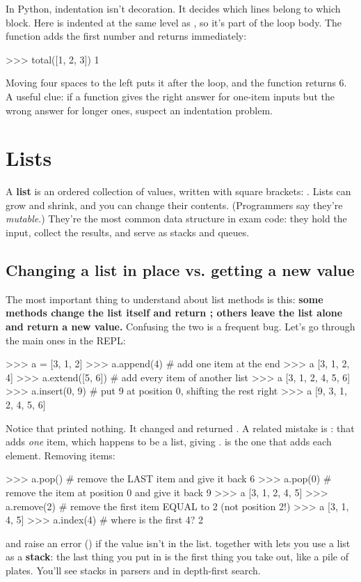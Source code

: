 \documentclass[10pt,a4paper]{article}
\begin{document}
In Python, indentation isn’t decoration. It decides which lines belong to which block. Here  is indented at the same level as , so it’s part of the loop body. The function adds the first number and returns immediately:
\begin{txtcode}
>>> total([1, 2, 3])
1
\end{txtcode}
Moving  four spaces to the left puts it after the loop, and the function returns 6. A useful clue: if a function gives the right answer for one-item inputs but the wrong answer for longer ones, suspect an indentation problem.
\setcounter{section}{5}
\section{Lists}
A \textbf{list} is an ordered collection of values, written with square brackets: . Lists can grow and shrink, and you can change their contents. (Programmers say they’re \emph{mutable}.) They’re the most common data structure in exam code: they hold the input, collect the results, and serve as stacks and queues.
\subsection{Changing a list in place vs. getting a new value}
The most important thing to understand about list methods is this: \textbf{some methods change the list itself and return ; others leave the list alone and return a new value.} Confusing the two is a frequent bug.
Let’s go through the main ones in the REPL:
\begin{txtcode}
>>> a = [3, 1, 2]
>>> a.append(4)          # add one item at the end
>>> a
[3, 1, 2, 4]
>>> a.extend([5, 6])     # add every item of another list
>>> a
[3, 1, 2, 4, 5, 6]
>>> a.insert(0, 9)       # put 9 at position 0, shifting the rest right
>>> a
[9, 3, 1, 2, 4, 5, 6]
\end{txtcode}
Notice that  printed nothing. It changed  and returned . A related mistake is : that adds \emph{one} item, which happens to be a list, giving \code{[...,\allowbreak{}\ [5,\allowbreak{}\ 6]]}.  is the one that adds each element.
Removing items:
\begin{txtcode}
>>> a.pop()              # remove the LAST item and give it back
6
>>> a.pop(0)             # remove the item at position 0 and give it back
9
>>> a
[3, 1, 2, 4, 5]
>>> a.remove(2)          # remove the first item EQUAL to 2 (not position 2!)
>>> a
[3, 1, 4, 5]
>>> a.index(4)           # where is the first 4?
2
\end{txtcode}
 and  raise an error () if the value isn’t in the list.
 together with  lets you use a list as a \textbf{stack}: the last thing you put in is the first thing you take out, like a pile of plates. You’ll see stacks in parsers and in depth-first search.
\end{document}
